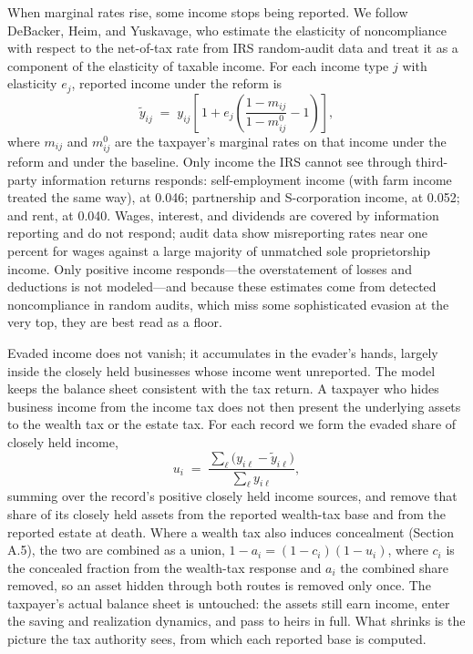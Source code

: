 \documentclass[10pt,twocolumn]{article}
\begin{document}
When marginal rates rise, some income stops being reported. We follow
DeBacker, Heim, and Yuskavage, who estimate the elasticity of noncompliance
with respect to the net-of-tax rate from IRS random-audit data and treat it as
a component of the elasticity of taxable income. For each income type $j$ with
elasticity $e_j$, reported income under the reform is
\begin{equation*}
\tilde y_{ij} \;=\; y_{ij}\left[\,1 + e_j\!\left(\frac{1-m_{ij}}{1-m^0_{ij}} - 1\right)\right],
\end{equation*}
where $m_{ij}$ and $m^0_{ij}$ are the taxpayer's marginal rates on that income
under the reform and under the baseline. Only income the IRS cannot see
through third-party information returns responds: self-employment income
(with farm income treated the same way), at 0.046; partnership and
S-corporation income, at 0.052; and rent, at 0.040. Wages, interest, and
dividends are covered by information reporting and do not respond; audit data
show misreporting rates near one percent for wages against a large majority of
unmatched sole proprietorship income. Only positive income responds---the
overstatement of losses and deductions is not modeled---and because these
estimates come from detected noncompliance in random audits, which miss some
sophisticated evasion at the very top, they are best read as a floor.

Evaded income does not vanish; it accumulates in the evader's hands, largely
inside the closely held businesses whose income went unreported. The model
keeps the balance sheet consistent with the tax return. A taxpayer who hides
business income from the income tax does not then present the underlying
assets to the wealth tax or the estate tax. For each record we form the evaded
share of closely held income,
\begin{equation*}
u_i \;=\; \frac{\sum_{\ell}\big(y_{i\ell} - \tilde y_{i\ell}\big)}{\sum_{\ell} y_{i\ell}},
\end{equation*}
summing over the record's positive closely held income sources, and remove
that share of its closely held assets from the reported wealth-tax base and
from the reported estate at death. Where a wealth tax also induces concealment
(Section A.5), the two are combined as a union,
$1 - a_i = (1 - c_i)(1 - u_i)$, where $c_i$ is the concealed fraction from the
wealth-tax response and $a_i$ the combined share removed, so an asset hidden
through both routes is removed only once. The taxpayer's actual balance sheet is untouched: the assets still earn
income, enter the saving and realization dynamics, and pass to heirs in full.
What shrinks is the picture the tax authority sees, from which each reported
base is computed.
\end{document}
